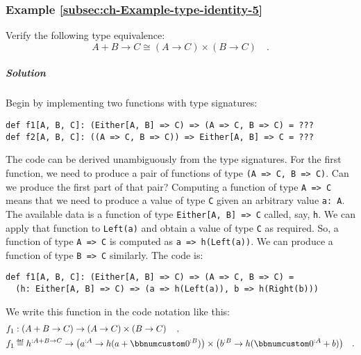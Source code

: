 \subsubsection{Example \label{subsec:ch-Example-type-identity-5}\ref{subsec:ch-Example-type-identity-5}}

Verify the following type equivalence:
\[
A+B\rightarrow C\cong(A\rightarrow C)\times(B\rightarrow C)\quad.
\]


\subparagraph{Solution}

Begin by implementing two functions with type signatures:
\begin{lstlisting}
def f1[A, B, C]: (Either[A, B] => C) => (A => C, B => C) = ???
def f2[A, B, C]: ((A => C, B => C)) => Either[A, B] => C = ???
\end{lstlisting}
The code can be derived unambiguously from the type signatures. For
the first function, we need to produce a pair of functions of type
\lstinline!(A => C, B => C)!. Can we produce the first part of that
pair? Computing a function of type \lstinline!A => C! means that
we need to produce a value of type \lstinline!C! given an arbitrary
value \lstinline!a: A!. The available data is a function of type
\lstinline!Either[A, B] => C! called, say, \lstinline!h!. We can
apply that function to \lstinline!Left(a)! and obtain a value of
type \lstinline!C! as required. So, a function of type \lstinline!A => C!
is computed as \lstinline!a => h(Left(a))!. We can produce a function
of type \lstinline!B => C! similarly. The code is:
\begin{lstlisting}
def f1[A, B, C]: (Either[A, B] => C) => (A => C, B => C) =
  (h: Either[A, B] => C) => (a => h(Left(a)), b => h(Right(b)))
\end{lstlisting}
We write this function in the code notation like this:
\begin{align*}
 & f_{1}:\left(A+B\rightarrow C\right)\rightarrow\left(A\rightarrow C\right)\times\left(B\rightarrow C\right)\quad,\\
 & f_{1}\triangleq h^{:A+B\rightarrow C}\rightarrow\big(a^{:A}\rightarrow h(a+\bbnum 0^{:B})\big)\times\big(b^{:B}\rightarrow h(\bbnum 0^{:A}+b)\big)\quad.
\end{align*}


